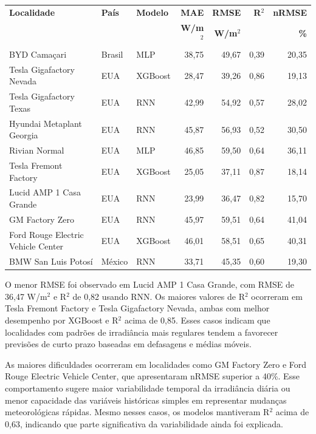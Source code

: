 \documentclass[12pt,a4paper]{article}
\begin{document}
\begin{center}
\small
\begin{tabular}{p{5.2cm}p{1.6cm}p{1.9cm}rrrr}
\toprule
\textbf{Localidade} & \textbf{País} & \textbf{Modelo} & \textbf{MAE} & \textbf{RMSE} & \textbf{R$^2$} & \textbf{nRMSE} \\
 & & & \textbf{W/m$^2$} & \textbf{W/m$^2$} & & \textbf{\%} \\
\midrule
BYD Camaçari & Brasil & MLP & 38,75 & 49,67 & 0,39 & 20,35 \\
Tesla Gigafactory Nevada & EUA & XGBoost & 28,47 & 39,26 & 0,86 & 19,13 \\
Tesla Gigafactory Texas & EUA & RNN & 42,99 & 54,92 & 0,57 & 28,02 \\
Hyundai Metaplant Georgia & EUA & RNN & 45,87 & 56,93 & 0,52 & 30,50 \\
Rivian Normal & EUA & MLP & 46,85 & 59,50 & 0,64 & 36,11 \\
Tesla Fremont Factory & EUA & XGBoost & 25,05 & 37,11 & 0,87 & 18,14 \\
Lucid AMP 1 Casa Grande & EUA & RNN & 23,99 & 36,47 & 0,82 & 15,70 \\
GM Factory Zero & EUA & RNN & 45,97 & 59,51 & 0,64 & 41,04 \\
Ford Rouge Electric Vehicle Center & EUA & XGBoost & 46,01 & 58,51 & 0,65 & 40,31 \\
BMW San Luis Potosí & México & RNN & 33,71 & 45,35 & 0,60 & 19,30 \\
\bottomrule
\end{tabular}
\end{center}

\vspace{6pt}

O menor RMSE foi observado em Lucid AMP 1 Casa Grande, com RMSE de 36,47 W/m$^2$ e R$^2$ de 0,82 usando RNN. Os maiores valores de R$^2$ ocorreram em Tesla Fremont Factory e Tesla Gigafactory Nevada, ambas com melhor desempenho por XGBoost e R$^2$ acima de 0,85. Esses casos indicam que localidades com padrões de irradiância mais regulares tendem a favorecer previsões de curto prazo baseadas em defasagens e médias móveis.

As maiores dificuldades ocorreram em localidades como GM Factory Zero e Ford Rouge Electric Vehicle Center, que apresentaram nRMSE superior a 40\%. Esse comportamento sugere maior variabilidade temporal da irradiância diária ou menor capacidade das variáveis históricas simples em representar mudanças meteorológicas rápidas. Mesmo nesses casos, os modelos mantiveram R$^2$ acima de 0,63, indicando que parte significativa da variabilidade ainda foi explicada.
\end{document}
